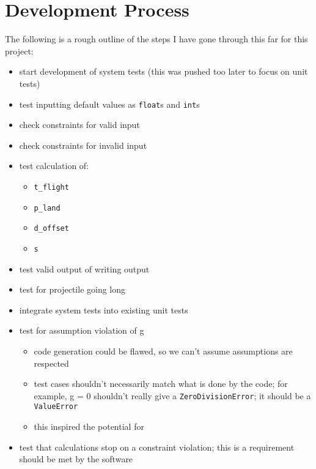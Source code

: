 \chapter{Development Process}
\label{chap:dev-proc}

The following is a rough outline of the steps I have gone through this far for
this project:

\begin{itemize}
    \item start development of system tests (this was pushed too later to focus
          on unit tests)
    \item test inputting default values as \texttt{float}s and \texttt{int}s
    \item check constraints for valid input
    \item check constraints for invalid input
    \item test calculation of:
          \begin{itemize}
              \item \texttt{t\_flight}
              \item \texttt{p\_land}
              \item \texttt{d\_offset}
              \item \texttt{s}
          \end{itemize}
    \item test valid output of writing output
    \item test for projectile going long
    \item integrate system tests into existing unit tests
    \item test for assumption violation of g
          \begin{itemize}
              \item code generation could be flawed, so we can't assume
                    assumptions are respected
              \item test cases shouldn't necessarily match what is done by the
                    code; for example, g = 0 shouldn't really give a
                    \texttt{ZeroDivisionError}; it should be a \texttt{ValueError}
              \item this inspired the potential for
          \end{itemize}
    \item test that calculations stop on a constraint violation; this is a
          requirement should be met by the software

\end{itemize}
